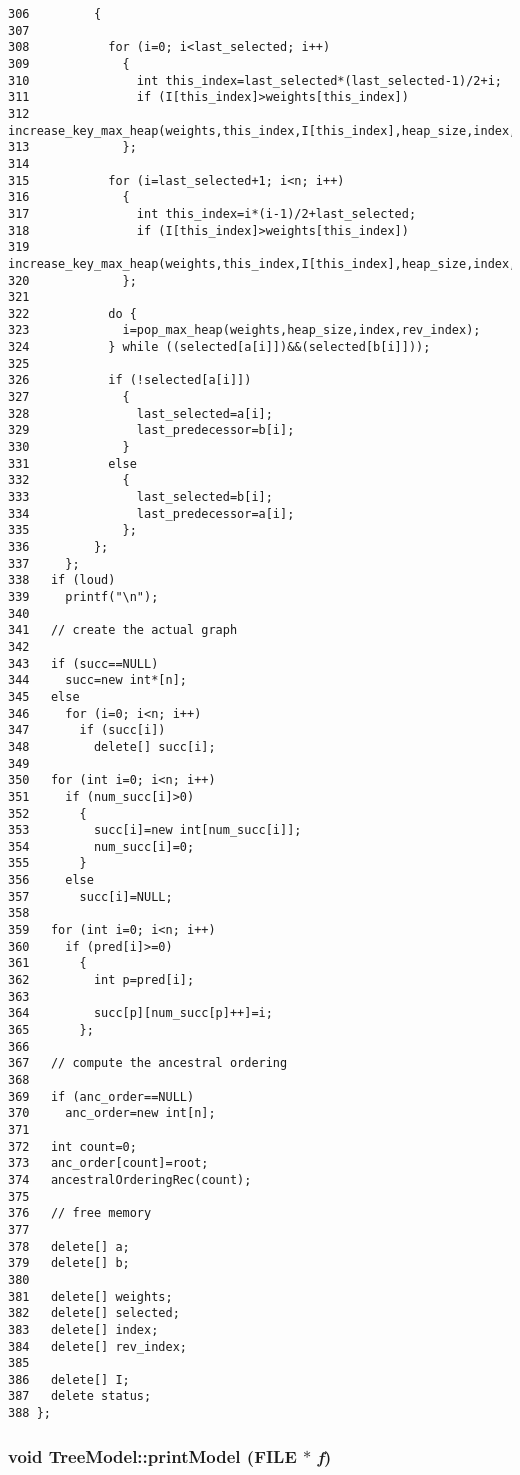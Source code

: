 \begin{Code}
\begin{verbatim}
306         {
307 
308           for (i=0; i<last_selected; i++)
309             {
310               int this_index=last_selected*(last_selected-1)/2+i;
311               if (I[this_index]>weights[this_index])
312                 increase_key_max_heap(weights,this_index,I[this_index],heap_size,index,rev_index);
313             };
314           
315           for (i=last_selected+1; i<n; i++)
316             {
317               int this_index=i*(i-1)/2+last_selected;
318               if (I[this_index]>weights[this_index])
319                 increase_key_max_heap(weights,this_index,I[this_index],heap_size,index,rev_index);
320             };
321           
322           do {
323             i=pop_max_heap(weights,heap_size,index,rev_index);
324           } while ((selected[a[i]])&&(selected[b[i]]));
325 
326           if (!selected[a[i]])
327             {
328               last_selected=a[i];
329               last_predecessor=b[i];
330             }
331           else
332             {
333               last_selected=b[i];
334               last_predecessor=a[i];
335             };
336         };
337     };
338   if (loud)
339     printf("\n");
340 
341   // create the actual graph
342 
343   if (succ==NULL)
344     succ=new int*[n];
345   else
346     for (i=0; i<n; i++)
347       if (succ[i])
348         delete[] succ[i];
349   
350   for (int i=0; i<n; i++)
351     if (num_succ[i]>0)
352       {
353         succ[i]=new int[num_succ[i]];
354         num_succ[i]=0;
355       }
356     else
357       succ[i]=NULL;
358 
359   for (int i=0; i<n; i++)
360     if (pred[i]>=0)
361       {
362         int p=pred[i];
363 
364         succ[p][num_succ[p]++]=i;
365       }; 
366 
367   // compute the ancestral ordering
368 
369   if (anc_order==NULL)
370     anc_order=new int[n];
371 
372   int count=0;
373   anc_order[count]=root;
374   ancestralOrderingRec(count);
375 
376   // free memory
377 
378   delete[] a;
379   delete[] b;
380 
381   delete[] weights;
382   delete[] selected;
383   delete[] index;
384   delete[] rev_index;
385 
386   delete[] I;
387   delete status;
388 };
\end{verbatim}\end{Code}


\hypertarget{class_tree_model_78a4e01188411739ffbe132a48afa78b}{
\subsubsection[printModel]{\setlength{\rightskip}{0pt plus 5cm}void Tree\-Model::print\-Model (FILE $\ast$ {\em f})}}
\label{class_tree_model_78a4e01188411739ffbe132a48afa78b}


